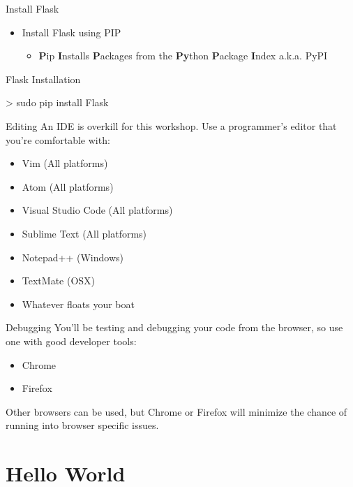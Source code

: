 \documentclass{beamer}
\begin{document}
	\begin{frame}[t]{Install Flask}
		\begin{itemize}
			\item{
				Install Flask using PIP
				\begin{itemize}
					\item{\textbf{P}ip \textbf{I}nstalls \textbf{P}ackages from
						the \textbf{Py}thon \textbf{P}ackage \textbf{I}ndex a.k.a. PyPI}
				\end{itemize}
			}
		\end{itemize}

		\begin{block}{Flask Installation}
		\begin{semiverbatim}
			> sudo pip install Flask
		\end{semiverbatim}
		\end{block}
	\end{frame}


	\begin{frame}[t]{Editing}
		An IDE is overkill for this workshop. Use a programmer's editor that
		you're comfortable with:
		\begin{itemize}
			\item{Vim (All platforms)}
			\item{Atom (All platforms)}
			\item{Visual Studio Code (All platforms)}
			\item{Sublime Text (All platforms)}
			\item{Notepad++ (Windows)}
			\item{TextMate (OSX)}
			\item{Whatever floats your boat}
		\end{itemize}
	\end{frame}


	\begin{frame}[t]{Debugging}
		You'll be testing and debugging your code from the browser, so use one
		with good developer tools:
		\begin{itemize}
			\item{Chrome}
			\item{Firefox}
		\end{itemize}

		Other browsers can be used, but Chrome or Firefox will minimize the
		chance of running into browser specific issues.
	\end{frame}


\section{Hello World}
\end{document}
